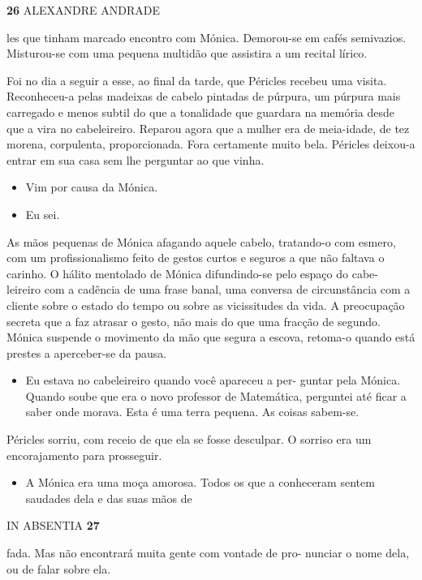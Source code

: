 \textbf{26 }ALEXANDRE ANDRADE

les que tinham marcado encontro com Mónica. Demorou-se em cafés
semivazios. Misturou-se com uma pequena multidão que assistira a um
recital lírico.

Foi no dia a seguir a esse, ao final da tarde, que Péricles recebeu uma
visita. Reconheceu-a pelas madeixas de cabelo pintadas de púrpura, um
púrpura mais carregado e menos subtil do que a tonalidade que guardara
na memória desde que a vira no cabeleireiro. Reparou agora que a mulher
era de meia-idade, de tez morena, corpulenta, proporcionada. Fora
certamente muito bela. Péricles deixou-a entrar em sua casa sem lhe
perguntar ao que vinha.

\begin{itemize}
\tightlist
\item
  Vim por causa da Mónica.
\item
  Eu sei.
\end{itemize}

As mãos pequenas de Mónica afagando aquele cabelo, tratando-o com
esmero, com um profissionalismo feito de gestos curtos e seguros a que
não faltava o carinho. O hálito mentolado de Mónica difundindo-se pelo
espaço do cabe- leireiro com a cadência de uma frase banal, uma conversa
de circunstância com a cliente sobre o estado do tempo ou sobre as
vicissitudes da vida. A preocupação secreta que a faz atrasar o gesto,
não mais do que uma fracção de segundo. Mónica suspende o movimento da
mão que segura a escova, retoma-o quando está prestes a aperceber-se da
pausa.

\begin{itemize}
\tightlist
\item
  Eu estava no cabeleireiro quando você apareceu a per- guntar pela
  Mónica. Quando soube que era o novo professor de Matemática, perguntei
  até ficar a saber onde morava. Esta é uma terra pequena. As coisas
  sabem-se.
\end{itemize}

Péricles sorriu, com receio de que ela se fosse desculpar. O sorriso era
um encorajamento para prosseguir.

\begin{itemize}
\tightlist
\item
  A Mónica era uma moça amorosa. Todos os que a conheceram sentem
  saudades dela e das suas mãos de
\end{itemize}

IN ABSENTIA \textbf{27}

fada. Mas não encontrará muita gente com vontade de pro- nunciar o nome
dela, ou de falar sobre ela.

